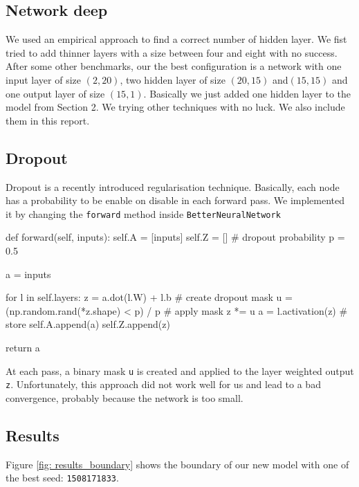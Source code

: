 \documentclass[11pt]{article}
\begin{document}
\subsection{Network deep}
We used an empirical approach to find a correct number of hidden layer. We fist tried to add thinner layers with a size between four and eight with no success. After some other benchmarks, our the best configuration is a network with one input layer of size $(2,20)$, two hidden layer of size $(20,15)$ and$(15,15)$ and one output layer of size $(15,1)$. Basically we just added one hidden layer to the model from Section 2.
We trying other techniques with no luck. We also include them in this report.
\subsection{Dropout}
Dropout is a recently introduced regularisation technique. Basically, each node has a probability to be enable on disable in each forward pass. We implemented it by changing the \texttt{forward} method inside \texttt{BetterNeuralNetwork}
\begin{python}
    def forward(self, inputs):
        self.A = [inputs]
        self.Z = []
        # dropout probability
        p = 0.5
        
        a = inputs

        for l in self.layers:
            z = a.dot(l.W) + l.b
            # create dropout mask
            u = (np.random.rand(*z.shape) < p) / p
            # apply mask
            z *= u
            a = l.activation(z)
            # store
            self.A.append(a)
            self.Z.append(z)

        return a
\end{python}
At each pass, a binary mask \texttt{u} is created and applied to the layer weighted output \texttt{z}. Unfortunately, this approach did not work well for us and lead to a bad convergence, probably because the network is too small.
\subsection{Results}
Figure \ref{fig: results_boundary} shows the boundary of our new model with one of the best seed: \texttt{1508171833}.
\end{document}

